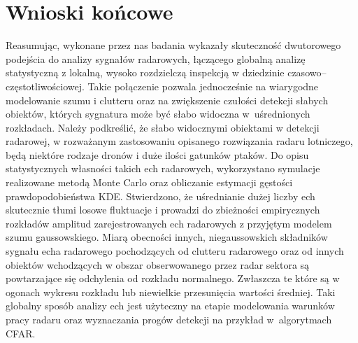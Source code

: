 \section{Wnioski końcowe}
Reasumując, wykonane przez nas badania wykazały skuteczność dwutorowego podejścia do analizy sygnałów radarowych, łączącego globalną analizę statystyczną z lokalną, wysoko rozdzielczą inspekcją w dziedzinie czasowo--częstotliwościowej. 
Takie połączenie pozwala jednocześnie na wiarygodne modelowanie szumu i clutteru oraz na zwiększenie czułości detekcji słabych obiektów, których sygnatura może być słabo widoczna w~uśrednionych rozkładach. Należy podkreślić, że słabo widocznymi obiektami w detekcji radarowej, w rozważanym zastosowaniu opisanego rozwiązania radaru lotniczego, będą niektóre rodzaje dronów i duże ilości gatunków ptaków. Do opisu statystycznych własności takich ech radarowych, wykorzystano symulacje realizowane metodą Monte Carlo oraz obliczanie estymacji gęstości prawdopodobieństwa KDE. Stwierdzono, że uśrednianie dużej liczby ech skutecznie tłumi losowe fluktuacje i prowadzi do zbieżności empirycznych rozkładów amplitud zarejestrowanych ech radarowych z przyjętym modelem szumu gaussowskiego. Miarą obecności innych, niegaussowskich składników sygnału echa radarowego pochodzących od clutteru radarowego oraz od innych obiektów wchodzących w obszar obserwowanego przez radar sektora są powtarzające się odchylenia od rozkładu normalnego. Zwłaszcza te które są w ogonach wykresu rozkładu lub niewielkie przesunięcia wartości średniej. Taki globalny sposób analizy ech jest użyteczny na etapie modelowania warunków pracy radaru oraz wyznaczania progów detekcji na przykład w~algorytmach CFAR. 

